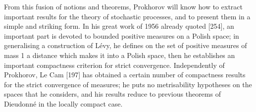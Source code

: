 From this fusion of notions and theorems, Prokhorov will know how to extract important results for the theory of stochastic processes, and to present them in a simple and striking form. In his great work of 1956 already quoted {[}254{]}, an important part is devoted to bounded positive measures on a Polish space; in generalising a construction of Lévy, he defines on the set of positive measures of mass 1 a distance which makes it into a Polish space, then he establishes an important compactness criterion for strict convergence. Independently of Prokhorov, Le Cam {[}197{]} has obtained a certain number of compactness results for the strict convergence of measures; he puts no metrisability hypotheses on the spaces that he considers, and his results reduce to previous theorems of Dieudonné in the locally compact case.

